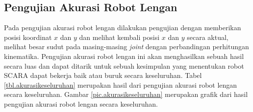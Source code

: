 \subsection{Pengujian Akurasi Robot Lengan}
Pada pengujian akurasi robot lengan dilakukan pengujian dengan memberikan posisi koordinat $x$ dan $y$ dan melihat kembali posisi $x$ dan $y$ secara aktual, melihat besar sudut pada masing-masing \textit{joint} dengan perbandingan perhitungan kinematika. Pengujian akurasi robot lengan ini akan menghasilkan sebuah hasil secara luas dan dapat ditarik untuk sebuah kesimpulan yang menentukan robot SCARA dapat bekerja baik atau buruk secara keseluruhan. Tabel \ref{tbl.akurasikeseluruhan} merupakan hasil dari pengujian akurasi robot lengan secara keseluruhan. Gambar \ref{pic.akurasikeseluruhan} merupakan grafik dari hasil pengujian akurasi robot lengan secara keseluruhan.

